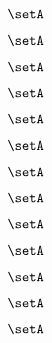 \begin{forslides}
    \begin{equation}
        \label{eq:slides-translation-54}
        \setA
    \end{equation}

    \begin{equation}
        \label{eq:slides-translation-55}
        \setA
    \end{equation}

    \begin{equation}
        \label{eq:slides-translation-56}
        \setA
    \end{equation}

    \begin{equation}
        \label{eq:slides-translation-57}
        \setA
    \end{equation}

    \begin{equation}
        \label{eq:slides-translation-58}
        \setA
    \end{equation}

    \begin{equation}
        \label{eq:slides-translation-59}
        \setA
    \end{equation}
    
    \begin{equation}
        \label{eq:slides-translation-60}
        \setA
    \end{equation}

    \begin{equation}
        \label{eq:slides-translation-61}
        \setA
    \end{equation}

    \begin{equation}
        \label{eq:slides-translation-62}
        \setA
    \end{equation}

    \begin{equation}
        \label{eq:slides-translation-63}
        \setA
    \end{equation}

    \begin{equation}
        \label{eq:slides-translation-64}
        \setA
    \end{equation}

    \begin{equation}
        \label{eq:slides-translation-65}
        \setA
    \end{equation}

    \begin{equation}
        \label{eq:slides-translation-66}
        \setA
    \end{equation}


\end{forslides}
